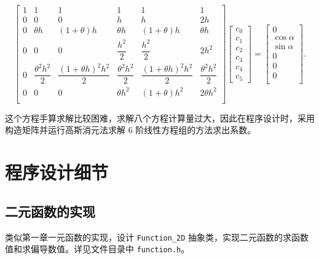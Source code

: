 \documentclass{ctexart}
\begin{document}
\begin{equation}
    \begin{bmatrix}
        1 & 1 & 1 & 1 & 1 & 1 \\
        0 & 0 & 0 & h & h & 2h \\
        0 & \theta h & (1+\theta)h & \theta h & (1+\theta)h & \theta h \\
        0 & 0 & 0 & \dfrac {h^2}2 & \dfrac {h^2}2 & 2h^2 \\
        0 & \dfrac {\theta^2h^2}2 & \dfrac {(1+\theta h)^2h^2}2 & \dfrac {\theta^2h^2}2 & \dfrac {(1+\theta h)^2h^2}2 & \dfrac {\theta^2h^2}2\\
        0 & 0 & 0 & \theta h^2 & (1+\theta)h^2 & 2\theta h^2\\
    \end{bmatrix}
    \begin{bmatrix}
        c_0\\
        c_1\\
        c_2\\
        c_3\\
        c_4\\
        c_5
    \end{bmatrix}
    =
    \begin{bmatrix}
        0\\
        \cos\alpha\\
        \sin\alpha\\
        0\\
        0\\
        0\\
    \end{bmatrix}.
\end{equation}

这个方程手算求解比较困难，求解八个方程计算量过大，因此在程序设计时，采用构造矩阵并运行高斯消元法求解 6 阶线性方程组的方法求出系数。

\section{程序设计细节}

\subsection{二元函数的实现}

类似第一章一元函数的实现，设计 \verb|Function_2D| 抽象类，实现二元函数的求函数值和求偏导数值。详见文件目录中 \verb|function.h|。
\end{document}
